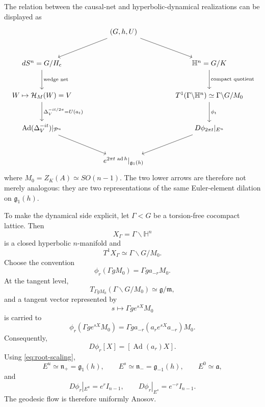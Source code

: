 \documentclass[11pt]{article}
\theoremstyle{definition}
\newcommand{\cH}{\mathcal{H}}
\newcommand{\Ad}{\operatorname{Ad}}
\begin{document}
The relation between the causal-net and hyperbolic-dynamical realizations can be displayed
as
\[
\begin{tikzcd}[column sep=large,row sep=large]
& (G,h,U) \arrow[dl] \arrow[dr] & \\
dS^n=G/H_{\rm c} \arrow[d,"\text{wedge net}"]
&&
\mathbb H^n=G/K \arrow[d,"\text{compact quotient}"]\\
W\mapsto \cH_M(W)=V
\arrow[d,"\Delta_V^{-it/2\pi}=U(a_t)"]
&&
T^1(\Gamma\backslash\mathbb H^n)\simeq\Gamma\backslash G/M_0
\arrow[d,"\phi_t"]\\
\Ad(\Delta_V^{-it})|_{\mathcal P^u}
\arrow[dr]
&&
D\phi_{2\pi t}|_{E^u}\arrow[dl]\\
&
e^{2\pi t\,\operatorname{ad}h}|_{\mathfrak g_1(h)}
&
\end{tikzcd}
\]
where \(M_0=Z_K(A)\simeq SO(n-1)\).  The two lower arrows are therefore not merely
analogous: they are two representations of the same Euler-element dilation on
\(\mathfrak g_1(h)\).

To make the dynamical side explicit, let \(\Gamma<G\) be a torsion-free cocompact lattice.
Then
\[
X_\Gamma=\Gamma\backslash\mathbb H^n
\]
is a closed hyperbolic \(n\)-manifold and
\begin{equation}
T^1X_\Gamma
\simeq
\Gamma\backslash G/M_0.
\label{eq:unit-tangent}
\end{equation}
Choose the convention
\begin{equation}
\phi_r(\Gamma gM_0)=\Gamma ga_{-r}M_0.
\label{eq:geodesic-flow}
\end{equation}
At the tangent level,
\[
T_{\Gamma gM_0}(\Gamma\backslash G/M_0)\simeq \mathfrak g/\mathfrak m,
\]
and a tangent vector represented by
\[
s\longmapsto \Gamma ge^{sX}M_0
\]
is carried to
\[
\phi_r(\Gamma ge^{sX}M_0)
=
\Gamma ga_{-r}\left(a_re^{sX}a_{-r}\right)M_0.
\]
Consequently,
\begin{equation}
D\phi_r[X]=[\Ad(a_r)X].
\label{eq:derivative-adjoint}
\end{equation}
Using \eqref{eq:root-scaling},
\begin{equation}
E^u\simeq\mathfrak n_+=\mathfrak g_1(h),\qquad
E^s\simeq\mathfrak n_-=\mathfrak g_{-1}(h),\qquad
E^0\simeq\mathfrak a,
\label{eq:splitting}
\end{equation}
and
\begin{equation}
D\phi_r|_{E^u}=e^r I_{n-1},
\qquad
D\phi_r|_{E^s}=e^{-r}I_{n-1}.
\label{eq:anosov-derivative}
\end{equation}
The geodesic flow is therefore uniformly Anosov.
\end{document}
